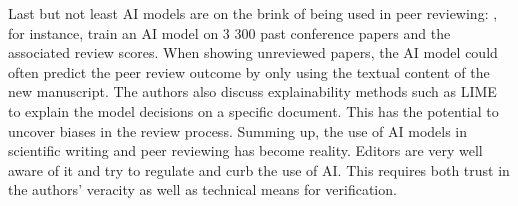Last but not least AI models are on the brink of being used in peer reviewing: 
\citet{checco2021ai}, for instance, train an AI model on 3 300 past conference papers and the associated review scores. When showing unreviewed papers, the AI model could often predict the peer review outcome by only using the textual content of the new manuscript. The authors also discuss explainability methods such as LIME to explain the model decisions on a specific document. This has the potential to uncover biases in the review process.
Summing up, the use of AI models in scientific writing and peer reviewing has become reality. Editors are very well aware of it and try to regulate and curb the use of AI. This requires both trust in the authors' veracity as well as technical means for verification. %
\fi

